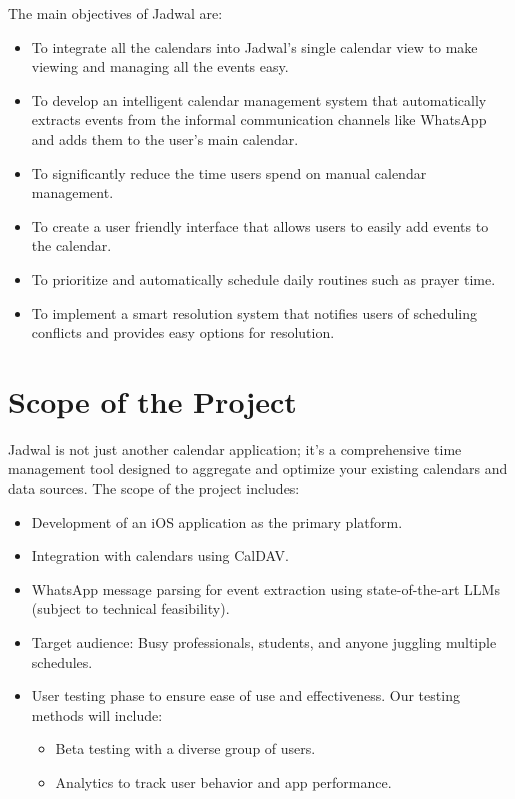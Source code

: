 \documentclass[12pt,a4paper]{report}
\begin{document}
The main objectives of Jadwal are:
\begin{itemize}

    \item To integrate all the calendars into Jadwal's single calendar view to make viewing and managing all the events easy.
    \item To develop an intelligent calendar management system that automatically extracts events from the informal communication channels like WhatsApp and adds them to the user's main calendar.
    \item To significantly reduce the time users spend on manual calendar management.
    \item To create a user friendly interface that allows users to easily add events to the calendar.
    \item To prioritize and automatically schedule daily routines such as prayer time.
    \item To implement a smart resolution system that notifies users of scheduling conflicts and provides easy options for resolution.
\end{itemize}

\section{Scope of the Project}

Jadwal is not just another calendar application; it's a comprehensive time management tool designed to aggregate and optimize your existing calendars and data sources. The scope of the project includes:
\begin{itemize}
    \item Development of an iOS application as the primary platform.
    \item Integration with calendars using CalDAV.
    \item WhatsApp message parsing for event extraction using state-of-the-art LLMs (subject to technical feasibility).
    \item Target audience: Busy professionals, students, and anyone juggling multiple schedules.
    \item User testing phase to ensure ease of use and effectiveness. Our testing methods will include:
          \begin{itemize}
              \item Beta testing with a diverse group of users.
              \item Analytics to track user behavior and app performance.
          \end{itemize}
\end{itemize}
\end{document}
